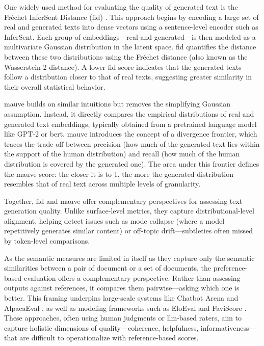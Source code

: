 One widely used method for evaluating the quality of generated text is the Fréchet InferSent Distance (\gls{fid}) \citep{heusel2017fid}. This approach begins by encoding a large set of real and generated texts into dense vectors using a sentence-level encoder such as InferSent. Each group of embeddings—real and generated—is then modeled as a multivariate Gaussian distribution in the latent space. \gls{fid} quantifies the distance between these two distributions using the Fréchet distance (also known as the Wasserstein-2 distance). A lower \gls{fid} score indicates that the generated texts follow a distribution closer to that of real texts, suggesting greater similarity in their overall statistical behavior.

\gls{mauve} \citep{pillutla2021mauve} builds on similar intuitions but removes the simplifying Gaussian assumption. Instead, it directly compares the empirical distributions of real and generated text embeddings, typically obtained from a pretrained language model like GPT-2 or \gls{bert}. \gls{mauve} introduces the concept of a divergence frontier, which traces the trade-off between precision (how much of the generated text lies within the support of the human distribution) and recall (how much of the human distribution is covered by the generated one). The area under this frontier defines the \gls{mauve} score: the closer it is to 1, the more the generated distribution resembles that of real text across multiple levels of granularity.

Together, \gls{fid} and \gls{mauve} offer complementary perspectives for assessing text generation quality. Unlike surface-level metrics, they capture distributional-level alignment, helping detect issues such as mode collapse (where a model repetitively generates similar content) or off-topic drift—subtleties often missed by token-level comparisons.

As the semantic measures are limited in itself as they capture only the semantic similarities between a pair of document or a set of documents, the preference-based evaluation offers a complementary perspective. Rather than assessing outputs against references, it compares them pairwise—asking which one is better. This framing underpins large-scale systems like Chatbot Arena \citep{zheng2024chatbotarena} and AlpacaEval \citep{alpacaeval2023}, as well as modeling frameworks such as EloEval \citep{cao2024eloeval} and FaviScore \citep{vondaeniken2024faviscore}. These approaches, often using human judgments or \gls{llm}-based raters, aim to capture holistic dimensions of quality—coherence, helpfulness, informativeness—that are difficult to operationalize with reference-based scores.

